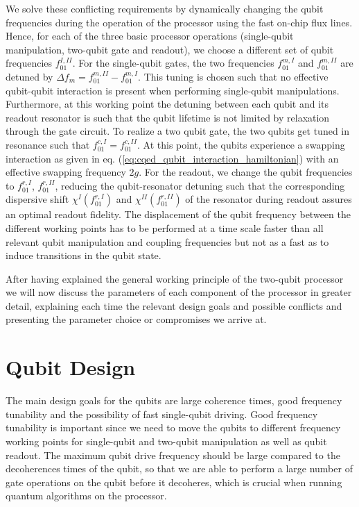 We solve these conflicting requirements by dynamically changing the qubit frequencies during the operation of the processor using the fast on-chip flux lines. Hence, for each of the three basic processor operations (single-qubit manipulation, two-qubit gate and readout), we choose a different set of qubit frequencies $f_{01}^{I,II}$. For the single-qubit gates, the two frequencies $f_{01}^{m,I}$ and $f_{01}^{m,II}$ are detuned by $\Delta f_m = f_{01}^{m,II}-f_{01}^{m,I}$. This tuning is chosen such that no effective qubit-qubit interaction is present when performing single-qubit manipulations. Furthermore, at this working point the detuning between each qubit and its readout resonator is such that the qubit lifetime is not limited by relaxation through the gate circuit. To realize a two qubit gate, the two qubits get tuned in resonance such that $f_{01}^{c,I} = f_{01}^{c,II}$. At this point, the qubits experience a swapping interaction as given in eq. (\ref{eq:cqed_qubit_interaction_hamiltonian}) with an effective swapping frequency $2g$. For the readout, we change the qubit frequencies to $f_{01}^{r,I}$, $f_{01}^{r,II}$, reducing the qubit-resonator detuning such that the corresponding dispersive shift $\chi^I(f_{01}^{r,I})$ and $\chi^{II}(f_{01}^{r,II})$ of the resonator during readout assures an optimal readout fidelity. The displacement of the qubit frequency between the different working points has to be performed at a time scale faster than all relevant qubit manipulation and coupling frequencies but not as a fast as to induce transitions in the qubit state.

\smallskip

After having explained the general working principle of the two-qubit processor we will now discuss the parameters of each component of the processor in greater detail, explaining each time the relevant design goals and possible conflicts and presenting the parameter choice or compromises we arrive at.

\section{Qubit Design}

The main design goals for the qubits are large coherence times, good frequency tunability and the possibility of fast single-qubit driving. Good frequency tunability is important since we need to move the qubits to different frequency working points for single-qubit and two-qubit manipulation as well as qubit readout. The maximum qubit drive frequency should be large compared to the decoherences times of the qubit, so that we are able to perform a large number of gate operations on the qubit before it decoheres, which is crucial when running quantum algorithms on the processor.

